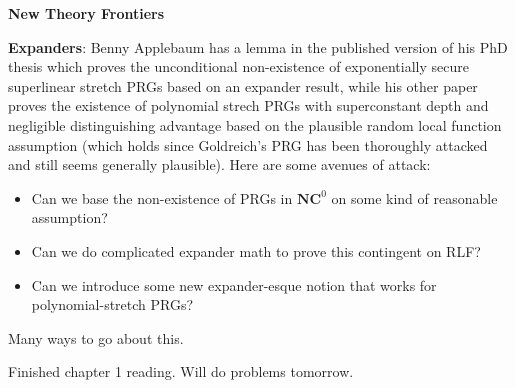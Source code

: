 \documentclass{tufte-book}
\newenvironment{loggentry}[2]%
{\noindent\textbf{#2}\marginnote{#1}\\}{\vspace{0.5cm}}
\begin{document}
\begin{loggentry}{2024-Feb-14}{New Theory Frontiers}
	\vspace{2mm}
	
	\textbf{Expanders}: Benny Applebaum has a lemma in the published version of his PhD thesis which proves the unconditional non-existence of exponentially secure superlinear stretch PRGs based on an expander result, while his other paper proves the existence of polynomial strech PRGs with superconstant depth and negligible distinguishing advantage based on the plausible random local function assumption (which holds since Goldreich's PRG has been thoroughly attacked and still seems generally plausible). Here are some avenues of attack:
	\begin{itemize}
		\item Can we base the non-existence of PRGs in $\mathbf{NC}^0$ on some kind of reasonable assumption?
		\item Can we do complicated expander math to prove this contingent on RLF?
		\item Can we introduce some new expander-esque notion that works for polynomial-stretch PRGs?
	\end{itemize} 
	Many ways to go about this.
	
	Finished chapter 1 reading. Will do problems tomorrow.
	\end{loggentry}
\end{document}
